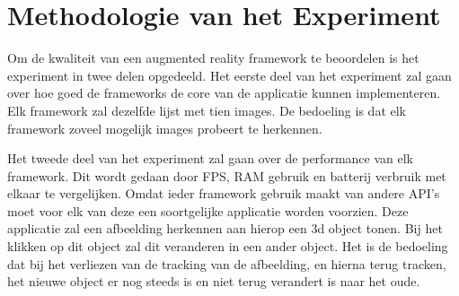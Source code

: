 
\chapter{Methodologie van het Experiment}
\label{ch:methodologie}

Om de kwaliteit van een augmented reality framework te beoordelen is het experiment in twee delen opgedeeld. Het eerste deel van het experiment zal gaan over hoe goed de frameworks de core van de applicatie kunnen implementeren. Elk framework zal dezelfde lijst met tien images. De bedoeling is dat elk framework zoveel mogelijk images probeert te herkennen. 

Het tweede deel van het experiment zal gaan over de performance van elk framework. Dit wordt gedaan door FPS, RAM gebruik en batterij verbruik met elkaar te vergelijken. Omdat ieder framework gebruik maakt van andere API's moet voor elk van deze een soortgelijke applicatie worden voorzien. Deze applicatie zal een afbeelding herkennen aan hierop een 3d object tonen. Bij het klikken op dit object zal dit veranderen in een ander object. Het is de bedoeling dat bij het verliezen van de tracking van de afbeelding, en hierna terug tracken, het nieuwe object er nog steeds is en niet terug verandert is naar het oude.
